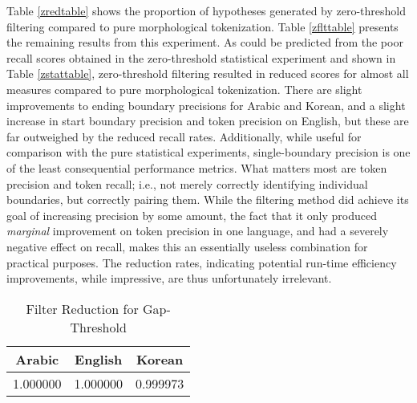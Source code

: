 Table \ref{zredtable} shows the proportion of hypotheses generated by zero-threshold filtering compared to pure morphological tokenization. Table \ref{zflttable} presents the remaining results from this experiment. As could be predicted from the poor recall scores obtained in the zero-threshold statistical experiment and shown in Table \ref{zstattable}, zero-threshold filtering resulted in reduced scores for almost all measures compared to pure morphological tokenization. There are slight improvements to ending boundary precisions for Arabic and Korean, and a slight increase in start boundary precision and token precision on English, but these are far outweighed by the reduced recall rates. Additionally, while useful for comparison with the pure statistical experiments, single-boundary precision is one of the least consequential performance metrics. What matters most are token precision and token recall; i.e., not merely correctly identifying individual boundaries, but correctly pairing them. While the filtering method did achieve its goal of increasing precision by some amount, the fact that it only produced \textit{marginal} improvement on token precision in one language, and had a severely negative effect on recall, makes this an essentially useless combination for practical purposes. The reduction rates, indicating potential run-time efficiency improvements, while impressive, are thus unfortunately irrelevant.

\begin{table}
	\centering	
	\begin{tabular}{| c | c | c |}
		\hline
		Arabic & English & Korean \\ \hline
		1.000000 & 1.000000 & 0.999973 \\ \hline
	\end{tabular}
	\caption{Filter Reduction for Gap-Threshold}
	\label{gredtable}
\end{table}

